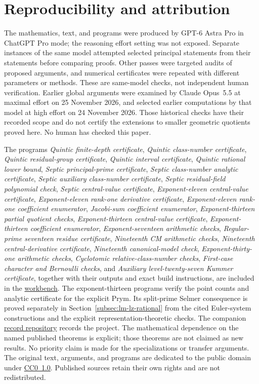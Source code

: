 \documentclass[11pt]{article}
\numberwithin{equation}{section}
\newcommand{\workbenchurl}{https://github.com/KokunoYumeto/k-theory-and-galois-groups-workbench}
\newcommand{\recordurl}{https://github.com/KokunoYumeto/mathematics-workbenches}
\theoremstyle{definition}
\begin{document}


\section*{Reproducibility and attribution}
The mathematics, text, and programs were produced by GPT-6 Astra Pro
in ChatGPT Pro mode; the reasoning effort setting was not exposed.
Separate instances of the same model attempted selected principal
statements from their statements before comparing proofs. Other
passes were targeted audits of proposed arguments, and numerical
certificates were repeated with different parameters or methods.
These are same-model checks, not independent human verification.
Earlier global arguments were examined by Claude Opus~5.5 at maximal
effort on 25 November 2026, and selected earlier computations by that
model at high effort on 24 November 2026. Those historical checks
have their recorded scope and do not certify the extensions to
smaller geometric quotients proved here. No human has checked this
paper.

The programs \emph{Quintic finite-depth certificate}, \emph{Quintic class-number certificate},
\emph{Quintic residual-group certificate},
\emph{Quintic interval certificate},
\emph{Quintic rational lower bound},
\emph{Septic principal-prime certificate}, \emph{Septic class-number analytic certificate}, \emph{Septic auxiliary class-number certificate}, \emph{Septic residual-field polynomial check},
\emph{Septic central-value certificate},
\emph{Exponent-eleven central-value certificate},
\emph{Exponent-eleven rank-one derivative certificate},
\emph{Exponent-eleven rank-one coefficient enumerator},
\emph{Jacobi-sum coefficient enumerator},
\emph{Exponent-thirteen partial quotient checks},
\emph{Exponent-thirteen central-value certificate},
\emph{Exponent-thirteen coefficient enumerator},
\emph{Exponent-seventeen arithmetic checks},
\emph{Regular-prime seventeen residue certificate},
\emph{Nineteenth CM arithmetic checks},
\emph{Nineteenth central-derivative certificate},
\emph{Nineteenth canonical-model check},
\emph{Exponent-thirty-one arithmetic checks},
\emph{Cyclotomic relative-class-number checks},
\emph{First-case character and Bernoulli checks}, and
\emph{Auxiliary level-twenty-seven Kummer certificate}, together with their
outputs and exact build instructions, are included in the
\href{\workbenchurl}{workbench}. The exponent-thirteen programs verify
the point counts and analytic certificate for the explicit Prym.
Its split-prime Selmer consequence is proved separately in
Section~\ref{subsec:lm-lz-rational} from the cited Euler-system
constructions and the explicit representation-theoretic checks.
The companion \href{\recordurl}{record repository} records the project.
The mathematical dependence on the named published theorems is
explicit; those theorems are not claimed as new results. No priority
claim is made for the specializations or transfer arguments.
The original text, arguments, and programs are dedicated to the public
domain under
\href{https://creativecommons.org/publicdomain/zero/1.0/}{CC0~1.0}.
Published sources retain their own rights and are not redistributed.




\end{document}
